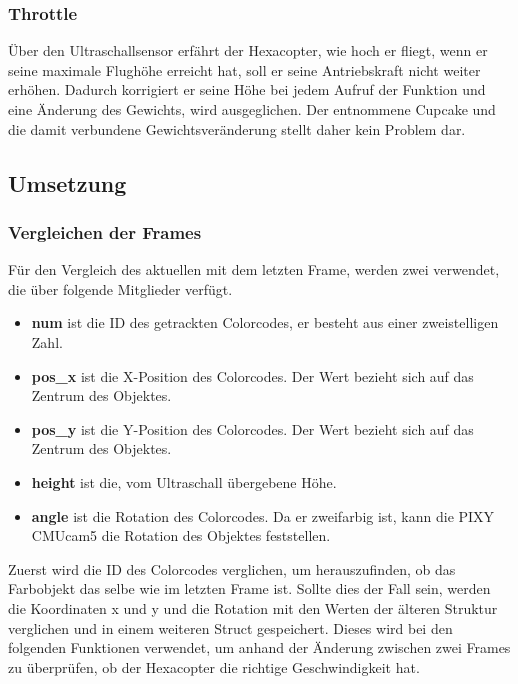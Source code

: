
    \subsubsection{Throttle}
    Über den Ultraschallsensor erfährt der Hexacopter, wie hoch er fliegt, wenn er seine maximale Flughöhe erreicht hat, soll er seine Antriebskraft nicht weiter erhöhen. Dadurch korrigiert er seine Höhe bei jedem Aufruf der Funktion und eine Änderung des Gewichts, wird ausgeglichen. Der entnommene Cupcake und die damit verbundene Gewichtsveränderung stellt daher kein Problem dar.

  \subsection{Umsetzung}

    \subsubsection{Vergleichen der Frames}
    Für den Vergleich des aktuellen mit dem letzten Frame, werden zwei  verwendet, die über folgende Mitglieder verfügt. \cite{Structs}
    \begin{itemize}
      \item \textbf{num} ist die ID des getrackten Colorcodes, er besteht aus einer zweistelligen Zahl.
      \item \textbf{pos\_x} ist die X-Position des Colorcodes. Der Wert bezieht sich auf das Zentrum des Objektes.
      \item \textbf{pos\_y} ist die Y-Position des Colorcodes. Der Wert bezieht sich auf das Zentrum des Objektes.
      \item \textbf{height} ist die, vom Ultraschall übergebene Höhe.
      \item \textbf{angle} ist die Rotation des Colorcodes. Da er zweifarbig ist, kann die PIXY CMUcam5 die Rotation des Objektes feststellen.
    \end{itemize}

    Zuerst wird die ID des Colorcodes verglichen, um herauszufinden, ob das Farbobjekt das selbe wie im letzten Frame ist.
    Sollte dies der Fall sein, werden die Koordinaten x und y und die Rotation mit den Werten der älteren Struktur verglichen und in einem weiteren Struct gespeichert. Dieses wird bei den folgenden Funktionen verwendet, um anhand der Änderung zwischen zwei Frames zu überprüfen, ob der Hexacopter die richtige Geschwindigkeit hat.

